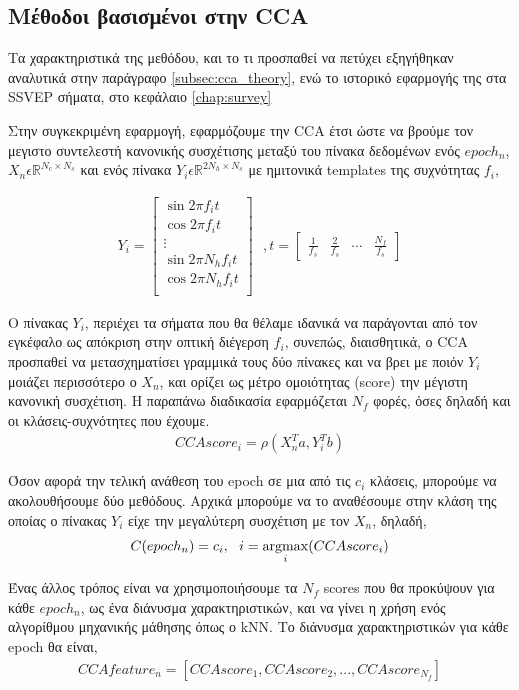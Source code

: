 \documentclass[11pt,a4paper,english,greek,twoside]{../Thesis}
\begin{document}
\subsection{Μέθοδοι βασισμένοι στην CCA}
\par Τα χαρακτηριστικά της μεθόδου, και το τι προσπαθεί να πετύχει εξηγήθηκαν αναλυτικά στην παράγραφο \ref{subsec:cca_theory}, ενώ το ιστορικό εφαρμογής της στα SSVEP σήματα, στο κεφάλαιο \ref{chap:survey} 

\par Στην συγκεκριμένη εφαρμογή, εφαρμόζουμε την CCA έτσι ώστε να βρούμε τον μεγιστο συντελεστή κανονικής συσχέτισης μεταξύ του πίνακα δεδομένων ενός $epoch_n$, $X_n \epsilon \mathbb{R}^{N_c\times N_s}$ και ενός πίνακα $Y_i \epsilon \mathbb{R}^{2N_h\times N_s}$ με ημιτονικά templates της συχνότητας $f_i$,

\begin{align}
\label{eq:cca_templates_Y}
    Y_i = \begin{bmatrix}
            \sin{2\pi f_i t} \\
            \cos{2\pi f_i t} \\
            \vdots \\
            \sin{2\pi N_hf_i t} \\
            \cos{2\pi N_hf_i t} \\
          \end{bmatrix}
          \ \ \ ,
    t = \begin{bmatrix}
            \frac{1}{f_s} & \frac{2}{f_s} & \cdots & \frac{N_f}{f_s}
        \end{bmatrix}
\end{align}

\par Ο πίνακας $Y_i$, περιέχει τα σήματα που θα θέλαμε ιδανικά να παράγονται από τον εγκέφαλο ως απόκριση στην οπτική διέγερση $f_i$, συνεπώς, διαισθητικά, ο CCA προσπαθεί να μετασχηματίσει γραμμικά τους δύο πίνακες και να βρει με ποιόν $Y_i$ μοιάζει περισσότερο ο $X_n$, και ορίζει ως μέτρο ομοιότητας (score) την μέγιστη κανονική συσχέτιση. Η παραπάνω διαδικασία εφαρμόζεται $N_f$ φορές, όσες δηλαδή και οι κλάσεις-συχνότητες που έχουμε.
\begin{align}
    CCAscore_i = \rho(X_n^Ta,Y_i^Tb)
\end{align}
\par Όσον αφορά την τελική ανάθεση του epoch σε μια από τις $c_i$ κλάσεις, μπορούμε να ακολουθήσουμε δύο μεθόδους. Αρχικά μπορούμε να το αναθέσουμε στην κλάση της οποίας ο πίνακας $Y_i$ είχε την μεγαλύτερη συσχέτιση με τον $X_n$, δηλαδή,
\begin{align}
    C(epoch_n) = c_i, \ \  i=\operatorname*{argmax}_i(CCAscore_i)
    \label{eqCCAmax}
\end{align}
\par Ένας άλλος τρόπος είναι να χρησιμοποιήσουμε τα $N_f$ scores που θα προκύψουν για κάθε $epoch_n$, ως ένα διάνυσμα χαρακτηριστικών, και να γίνει η χρήση ενός αλγορίθμου μηχανικής μάθησης όπως ο kNN. Το διάνυσμα χαρακτηριστικών για κάθε epoch θα είναι, 
\begin{align}
    CCAfeature_n = [CCAscore_1,CCAscore_2,...,CCAscore_{N_f}]
    \label{eqCCAkNN}
\end{align}
\end{document}
